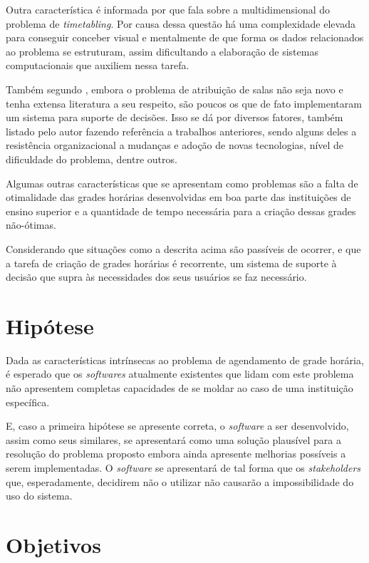 Outra característica é informada por  que fala sobre a multidimensional do problema de \textit{timetabling}. Por causa dessa questão há uma complexidade elevada para conseguir conceber visual e mentalmente de que forma os dados relacionados ao problema se estruturam, assim dificultando a elaboração de sistemas computacionais que auxiliem nessa tarefa.

Também segundo , embora o problema de atribuição de salas não seja novo e tenha extensa literatura a seu respeito, são poucos os que de fato implementaram um sistema para suporte de decisões. Isso se dá por diversos fatores, também listado pelo autor fazendo referência a trabalhos anteriores, sendo alguns deles a resistência organizacional a mudanças e adoção de novas tecnologias, nível de dificuldade do problema, dentre outros.

Algumas outras características que se apresentam como problemas são a falta de otimalidade das grades horárias desenvolvidas em boa parte das instituições de ensino superior e a quantidade de tempo necessária para a criação dessas grades não-ótimas.

Considerando que situações como a descrita acima são passíveis de ocorrer, e que a tarefa de criação de grades horárias é recorrente, um sistema de suporte à decisão que supra às necessidades dos seus usuários se faz necessário.

\section{Hipótese} \label{sec:Hipótese} %

Dada as características intrínsecas ao problema de agendamento de grade horária, é esperado que os \textit{softwares} atualmente existentes que lidam com este problema não apresentem completas capacidades de se moldar ao caso de uma instituição específica.

E, caso a primeira hipótese se apresente correta, o \textit{software} a ser desenvolvido, assim como seus similares, se apresentará como uma solução plausível para a resolução do problema proposto embora ainda apresente melhorias possíveis a serem implementadas. O \textit{software} se apresentará de tal forma que os \textit{stakeholders} que, esperadamente, decidirem não o utilizar não causarão a impossibilidade do uso do sistema.

\section{Objetivos} \label{sec:Objetivos} %

